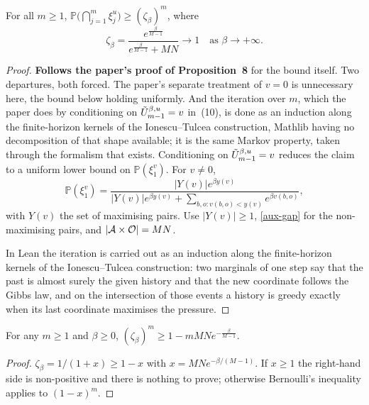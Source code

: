 \begin{proposition}
  \label{prop8}
  \leanok
  For all $m \ge 1$,
  $\mathbb{P}\bigl( \bigcap_{j=1}^{m} \xi_j^u \bigr) \ge (\zeta_\beta)^m$, where
  \[
    \zeta_\beta = \frac{e^{\frac{\beta}{M-1}}}{e^{\frac{\beta}{M-1}} + MN}
      \longrightarrow 1 \quad \text{as } \beta \to +\infty .
  \]
\end{proposition}
\begin{proof}
  \leanok
  \textbf{Follows the paper's proof of Proposition~8} for the bound
  itself.  Two departures, both forced.  The paper's separate treatment of
  $v = 0$ is unnecessary here, the bound below holding uniformly.  And the
  iteration over $m$, which the paper does by conditioning on
  $\tilde{U}^{\beta,u}_{m-1} = v$ in~(10), is done as an induction along the
  finite-horizon kernels of the Ionescu--Tulcea construction, Mathlib having no
  decomposition of that shape available; it is the same Markov property, taken
  through the formalism that exists.
  Conditioning on $\tilde{U}^{\beta,u}_{m-1} = v$ reduces the claim to a uniform lower
  bound on $\mathbb{P}(\xi_1^v)$.  For $v \ne 0$,
  \[
    \mathbb{P}(\xi_1^v) = \frac{|Y(v)| e^{\beta y(v)}}
      {|Y(v)| e^{\beta y(v)} + \sum_{b,o : v(b,o) < y(v)} e^{\beta v(b,o)}},
  \]
  with $Y(v)$ the set of maximising pairs.  Use $|Y(v)| \ge 1$, \ref{aux-gap}
  for the non-maximising pairs, and $|\mathcal{A} \times \mathcal{O}| = MN$.

  In Lean the iteration is carried out as an induction along the finite-horizon
  kernels of the Ionescu--Tulcea construction: two marginals of one step say
  that the past is almost surely the given history and that the new coordinate
  follows the Gibbs law, and on the intersection of those events a history is
  greedy exactly when its last coordinate maximises the pressure.
\end{proof}

\begin{remark}[Bernoulli]
  \label{rem4}
  \leanok
  For any $m \ge 1$ and $\beta \ge 0$,
  $(\zeta_\beta)^m \ge 1 - m M N e^{-\frac{\beta}{M-1}}$.
\end{remark}
\begin{proof}
  \leanok
  $\zeta_\beta = 1/(1+x) \ge 1-x$ with $x = MN e^{-\beta/(M-1)}$.  If $x \ge 1$
  the right-hand side is non-positive and there is nothing to prove; otherwise
  Bernoulli's inequality applies to $(1-x)^m$.
\end{proof}

